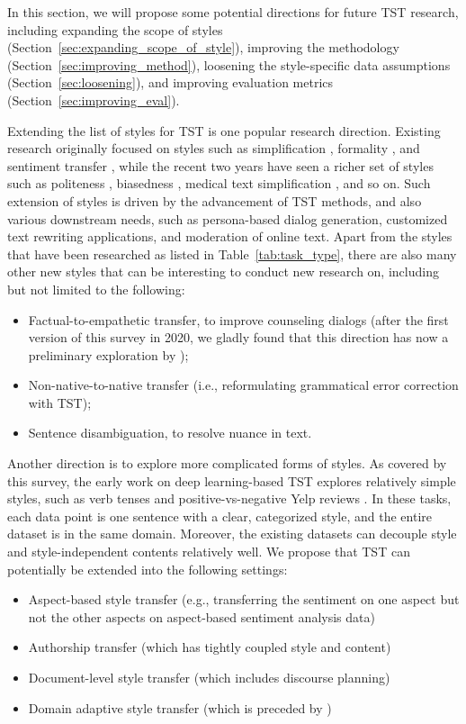 \label{sec:discussion}
In this section, we will propose some potential  directions for future TST research, including expanding the scope of styles (Section~\ref{sec:expanding_scope_of_style}), improving the methodology (Section~\ref{sec:improving_method}), loosening the style-specific data assumptions (Section~\ref{sec:loosening}), and improving evaluation metrics (Section~\ref{sec:improving_eval}).

\label{sec:expanding_scope_of_style}

Extending the list of styles for TST is one popular research direction. Existing research originally focused on styles such as simplification , formality , and sentiment transfer , while the recent two years have seen a richer set of styles such as politeness  , biasedness  ,   medical text simplification  , and so on.
Such extension of styles is driven by the advancement of TST methods, and also various downstream needs, such as persona-based dialog generation, customized text rewriting applications, and moderation of online text.
Apart from the styles that have been researched as listed in Table~\ref{tab:task_type}, there are also many other new styles that can be interesting to conduct new research on, including but not limited to the following:
\begin{itemize}
    \item Factual-to-empathetic transfer, to improve counseling dialogs (after the first version of this survey in 2020, we gladly found that this direction has now a preliminary exploration by );
    \item Non-native-to-native transfer (i.e., reformulating grammatical error correction with TST);
    \item Sentence disambiguation, to resolve nuance in text.
\end{itemize}

Another direction is to explore more complicated forms of styles. As covered by this survey, the early work on deep learning-based TST explores relatively simple styles, such as  verb tenses  and positive-vs-negative Yelp reviews . In these tasks, each data point is one sentence with a clear, categorized style, and the entire dataset is in the same domain. Moreover, the existing datasets can decouple style and style-independent contents relatively well.
We propose that TST can potentially be extended into the following settings:
\begin{itemize}
    \item Aspect-based style transfer (e.g., transferring the sentiment on one aspect but not the other aspects on aspect-based sentiment analysis data)
    \item Authorship transfer (which has tightly coupled style and content)
    \item Document-level style transfer (which includes discourse planning)
    \item Domain adaptive style transfer (which is preceded by )
\end{itemize}

